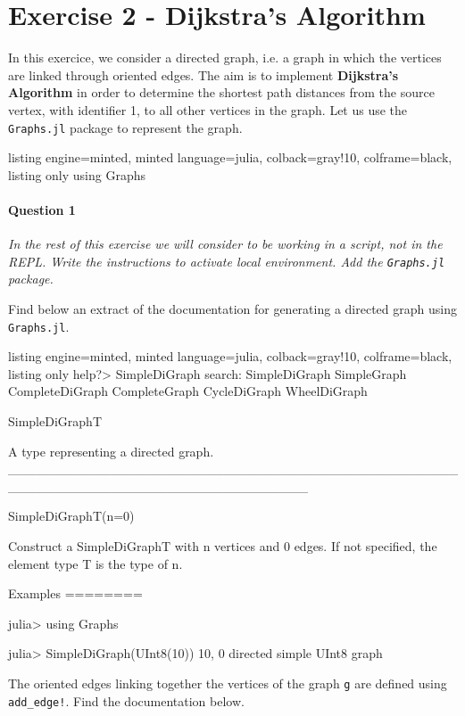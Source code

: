 \documentclass{article}
\begin{document}
\section*{Exercise 2 - Dijkstra’s Algorithm}

In this exercice, we consider a directed graph, i.e. a graph in which the vertices are linked through oriented edges. The aim is to implement \textbf{Dijkstra’s Algorithm} in order to determine the shortest path distances from the source vertex, with identifier 1, to all other vertices in the graph. Let us use the \texttt{Graphs.jl} package to represent the graph. 

\begin{tcblisting}{listing engine=minted, minted language=julia, colback=gray!10, colframe=black, listing only}
using Graphs
\end{tcblisting}

\paragraph{Question 1} \textit{In the rest of this exercise we will consider to be working in a script, not in the REPL. Write the instructions to activate local environment. Add the \texttt{Graphs.jl} package.}

\medskip
\noindent
Find below an extract of the documentation for generating a directed graph using \texttt{Graphs.jl}.

\begin{tcblisting}{listing engine=minted, minted language=julia, colback=gray!10, colframe=black, listing only}
help?> SimpleDiGraph
search: SimpleDiGraph SimpleGraph CompleteDiGraph CompleteGraph CycleDiGraph WheelDiGraph

  SimpleDiGraph{T}

  A type representing a directed graph.
  ________________________________________________________________________________

  SimpleDiGraph{T}(n=0)

  Construct a SimpleDiGraph{T} with n vertices and 0 edges. If not specified, the element
  type T is the type of n.

  Examples
  ========

  julia> using Graphs
  
  julia> SimpleDiGraph(UInt8(10))
  {10, 0} directed simple UInt8 graph
\end{tcblisting}

\medskip
\noindent
The oriented edges linking together the vertices of the graph \texttt{g} are defined using \texttt{add\_edge!}. Find the documentation below.
\end{document}
